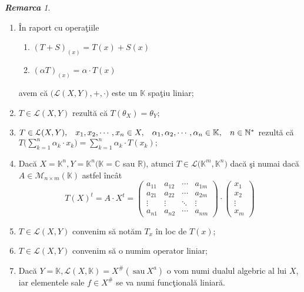 \documentclass[ a4paper, 12pt]{report}
\theoremstyle{definition}
\theoremstyle{remark}
\newtheorem{remarc}{\bf Remarca}[section]
\numberwithin{equation}{section}
\begin{document}
\begin{remarc}
\begin{enumerate}
\item \^In raport cu opera\c tiile 
\begin{enumerate}
\item $(T+S)_{(x)} = T(x) + S(x)$
\item $(\alpha T)_{(x)} = \alpha \cdot T(x)$
\end{enumerate} avem c\u a $\Big( \mathcal{L}(X,Y), + , \cdot\Big)$ este un $\mathbb{K}$ spa\c tiu liniar;
\item $T \in \mathcal{L}(X,Y)$ rezult\u a c\u a $T(\theta_{X}) = \theta_{Y};$
\item $T \in \mathcal{L}(X,Y),\hspace{3mm} x_1,x_2,\cdots,x_n \in X,\hspace{3mm} \alpha_1,\alpha_2, \cdots, \alpha_n \in \mathbb{K},\hspace{3mm} n \in \mathbb{N}^{\ast}$ rezult\u a c\u a $T\Big( \sum\limits_{k=1}^{n} \alpha_k \cdot x_k \Big) = \sum\limits_{k=1}^{n} \alpha_k \cdot T(x_k);$
\item Dac\u a $X = \mathbb{K}^{n}, Y = \mathbb{K}^{n} (\mathbb{K} = \mathbb{C}$ sau $\mathbb{R})$, atunci $T \in \mathcal{L}\Big( \mathbb{K}^{m}, \mathbb{K}^{n} \Big)$ dac\u a \c si numai dac\u a $A \in \mathcal{M}_{n \times m}(\mathbb{K})$ astfel \^inc\^at 
\[ T(X)^{t} = A \cdot X^{t} = \begin{pmatrix}
  a_{11} & a_{12} & \cdots & a_{1m} \\
  a_{21} & a_{22} & \cdots & a_{2m} \\
  \vdots  & \vdots  & \ddots & \vdots  \\
  a_{n1} & a_{n2} & \cdots & a_{nm}
 \end{pmatrix} \cdot \begin{pmatrix}
 x_1\\
 x_2\\
 \vdots\\
 x_m
 \end{pmatrix}
\]
\item $T \in \mathcal{L}(X,Y)$ convenim s\u a not\u am $T_{x}$ \^in loc de $T(x)$;
\item $T \in \mathcal{L}(X,Y)$ convenim s\u a o numim operator liniar;
\item Dac\u a $Y = \mathbb{K},  \mathcal{L}(X,\mathbb{K}) = X^{\#} (\ \mbox{sau}\ X^{a})$ o vom numi dualul algebric al lui $X$, iar elementele sale $f \in X^{\#}$ se va numi func\c tional\u a liniar\u a.
\end{enumerate}

\end{remarc}
\end{document}
